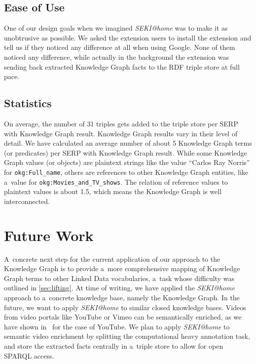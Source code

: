 \documentclass[runningheads,a4paper]{llncs}
\begin{document}
\subsection{Ease of Use}
One of our design goals when we imagined \emph{SEKI@home}
was to make it as unobtrusive as possible.
We asked the extension users to install the extension
and tell us if they noticed any difference at all when using Google.
None of them noticed any difference,
while actually in the background the extension
was sending back extracted Knowledge Graph facts
to the RDF triple store at full pace.

\subsection{Statistics}
On average, the number of 31 triples gets added to the triple store
per SERP with Knowledge Graph result.
Knowledge Graph results vary in their level of detail.
We have calculated an average number of about 5
Knowledge Graph terms (or predicates) per SERP with Knowledge Graph result.
While some Knowledge Graph values (or objects) are plaintext strings
like the value ``Carlos Ray Norris'' for \texttt{okg:Full\_name},
others are references to other Knowledge Graph entities,
like a~value for \texttt{okg:Movies\_and\_TV\_shows}.
The relation of reference values to plaintext values is about 1.5,
which means the Knowledge Graph is well interconnected.

\section{Future Work} \label{sec:future-work}
A~concrete next step for the current application
of our approach to the Knowledge Graph is
to provide a~more comprehensive mapping
of Knowledge Graph terms to other Linked Data vocabularies,
a~task whose difficulty was outlined in \autoref{sec:lifting}.
At time of writing, we have applied the \emph{SEKI@home} approach
to a~concrete knowledge base, namely the Knowledge Graph.
In the future, we want to apply \emph{SEKI@home} to
similar closed knowledge bases.
Videos from video portals like YouTube or Vimeo can be semantically enriched,
as we have shown in~\cite{steiner2010} for the case of YouTube.
We plan to apply \emph{SEKI@home} to semantic video enrichment by splitting
the computational heavy annotation task,
and store the extracted facts centrally in a~triple store
to allow for open SPARQL access.
\end{document}
